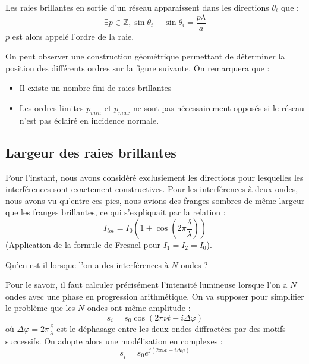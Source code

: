 \documentclass[11pt,fleqn]{book} %
\begin{document}
\begin{theorem}
	Les raies brillantes en sortie d’un réseau apparaissent dans les directions $\theta_t$ que :
	\begin{equation}
		\exists p \in \mathbb{Z}, \sin \theta_{t} - \sin \theta_i = \frac{p \lambda}{a}
	\end{equation}
	$p$ est alors appelé l'ordre de la raie.
\end{theorem}

On peut observer une construction géométrique permettant de déterminer la position des différents ordres sur la figure suivante. On remarquera que :
\begin{itemize}
	\item Il existe un nombre fini de raies brillantes
	\item Les ordres limites $p_{min}$ et $p_{max}$ ne sont pas nécessairement opposés si le réseau n'est pas éclairé en incidence normale.
\end{itemize}

\subsection{Largeur des raies brillantes}

Pour l'instant, nous avons considéré exclusiement les directions pour lesquelles les interférences sont exactement constructives. Pour les interférences à deux ondes, nous avons vu qu'entre ces pics, nous avions des franges sombres de même largeur que les franges brillantes, ce qui s'expliquait par la relation :
\begin{equation}
	I_{tot} = I_0 \left( 1 + \cos \left(2 \pi \frac{\delta}{\lambda} \right) \right)
\end{equation}
(Application de la formule de Fresnel pour $I_1 = I_2 = I_0$).

Qu'en est-il lorsque l'on a des interférences à $N$ ondes ?

Pour le savoir, il faut calculer précisément l'intensité lumineuse lorsque l'on a $N$ ondes avec une phase en progression arithmétique. On va supposer pour simplifier le problème que les $N$ ondes ont même amplitude :
\begin{equation}
	s_i = s_0 \cos(2 \pi \nu t - i \Delta \varphi)
\end{equation}
où $\Delta \varphi = 2 \pi \frac{\delta}{\lambda}$ est le déphasage entre les deux ondes diffractées par des motifs successifs.
On adopte alors une modélisation en complexes :
\begin{equation}
	\underline{s}_i = s_0 e^{j(2 \pi \nu t - i \Delta \varphi)}
\end{equation}
\end{document}
